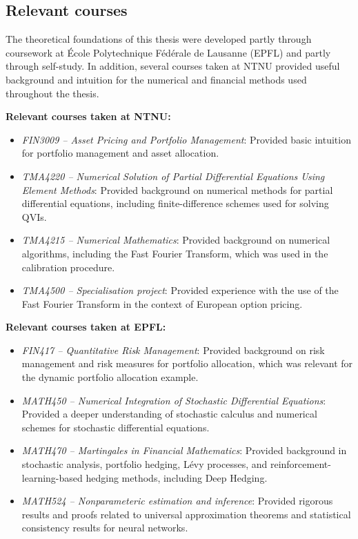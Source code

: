 \subsection*{Relevant courses}
The theoretical foundations of this thesis were developed partly through coursework at École Polytechnique Fédérale de Lausanne (EPFL) and partly through self-study. In addition, several courses taken at NTNU provided useful background and intuition for the numerical and financial methods used throughout the thesis.

\noindent \textbf{Relevant courses taken at NTNU:}
\begin{itemize}
    \item \textit{FIN3009 – Asset Pricing and Portfolio Management}: Provided basic intuition for portfolio management and asset allocation.
    \item \textit{TMA4220 – Numerical Solution of Partial Differential Equations Using Element Methods}: Provided background on numerical methods for partial differential equations, including finite-difference schemes used for solving QVIs.
    \item \textit{TMA4215 – Numerical Mathematics}: Provided background on numerical algorithms, including the Fast Fourier Transform, which was used in the calibration procedure.
    \item \textit{TMA4500 – Specialisation project}: Provided experience with the use of the Fast Fourier Transform in the context of European option pricing.
\end{itemize}

\noindent \textbf{Relevant courses taken at EPFL:}
\begin{itemize}
    \item \textit{FIN417 – Quantitative Risk Management}: Provided background on risk management and risk measures for portfolio allocation, which was relevant for the dynamic portfolio allocation example.
    \item \textit{MATH450 – Numerical Integration of Stochastic Differential Equations}: Provided a deeper understanding of stochastic calculus and numerical schemes for stochastic differential equations.
    \item \textit{MATH470 – Martingales in Financial Mathematics}: Provided background in stochastic analysis, portfolio hedging, Lévy processes, and reinforcement-learning-based hedging methods, including Deep Hedging.
    \item \textit{MATH524 – Nonparameteric estimation and inference}: Provided rigorous results and proofs related to universal approximation theorems and statistical consistency results for neural networks.
\end{itemize}